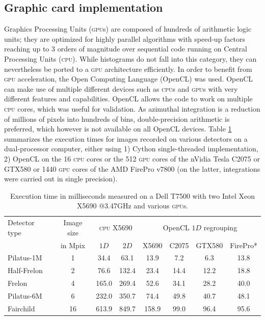\documentclass[a4paper]{jpconf}
\begin{document}
\subsection{Graphic card implementation}
Graphics Processing Units (\textsc{gpu}s) are composed of hundreds of
arithmetic logic units; they are optimized for highly
parallel algorithms with speed-up factors reaching up to 3 orders of magnitude
over sequential code running on Central Processing Units (\textsc{cpu}).
While histograms do not fall into this category, they can nevertheless be
ported to a \textsc{gpu} architecture efficiently.
In order to benefit from \textsc{gpu} acceleration,
the Open Computing Language\cite{opencl} (OpenCL) was used. OpenCL can make use
of multiple different devices such as \textsc{cpu}s and \textsc{gpu}s with very
different features and capabilities.
OpenCL allows the code to work on multiple \textsc{cpu} cores, which was
useful for validation.
As azimuthal integration is a reduction
of millions of pixels into hundreds of bins, double-precision arithmetic is
preferred, which however is not available on all OpenCL devices.
Table \ref{perfs} summarizes the execution times for images recorded on 
various detectors on a dual-processor computer, either using 1) 
Cython single-threaded implementation, 2) OpenCL on the 16
\textsc{cpu} cores or the 512 \textsc{gpu} cores of the nVidia Tesla C2075 or
GTX580 or 1440 \textsc{gpu} cores of the AMD FirePro v7800 (on the latter,
integrations were carried out in single precision).

\begin{table}[h]
\caption{\label{perfs}Execution time in milliseconds measured on a
Dell T7500 with two Intel Xeon X5690 @3.47GHz and various \textsc{gpu}s.}
\vspace{1mm}
\begin{center}
\begin{tabular}{|l|c||c|c||c|c|c|c|}
\hline
Detector type   & Image size 	& \multicolumn{2}{|c||}{\textsc{cpu} X5690}& \multicolumn{4}{|c|}{OpenCL $1D$ regrouping} \\
					& in Mpix		& $1D$	&	$2D$	&	X5690	&	C2075	&	GTX580	&	FirePro* \\
\hline
Pilatus-1M 			& 1  			& 34.4  &	63.1	&	13.9	&	7.2		&	6.3		&	13.8 \\
Half-Frelon 		& 2  			& 76.6  &   132.4   &	23.4	&	14.4	&	12.2	&	18.8 \\
Frelon 				& 4  			& 165.0	&	269.4   &	52.6	&	34.1	&	28.2	&	40.0 \\
Pilatus-6M 			& 6  			& 232.0	&	350.7	&	74.4	&	49.8	&	40.7	&	48.1 \\
Fairchild 			& 16 			& 613.9	&	849.7   &	158.9	&	99.0	&	96.4	&	95.6 \\
\hline
\end{tabular}
\end{center}
\end{table}
\end{document}
